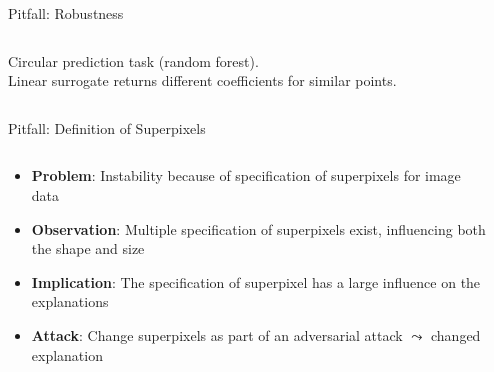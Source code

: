 \documentclass[11pt,compress,t,notes=noshow, aspectratio=169, xcolor=table]{beamer}
\begin{document}
\begin{frame}[c]{Pitfall: Robustness }
\begin{columns}
\begin{column}{0.48\textwidth}
\begin{center}
	{Circular prediction task (random forest). \\Linear surrogate returns different coefficients for similar points.}
	
	\end{center}
\end{column}
\end{columns}
\end{frame}

\begin{frame}{Pitfall: Definition of Superpixels }

\begin{columns}
    
    \begin{column}{0.6\textwidth}
        
        \begin{itemize}
        	\item \textbf{Problem}: Instability because of specification of superpixels for image data 
        	\item \textbf{Observation}: Multiple specification of superpixels exist, influencing both the shape and size 
        	\pause
        	\item \textbf{Implication}: The specification of superpixel has a large influence on the explanations 
        	\item \textbf{Attack}: Change superpixels as part of an adversarial attack $\leadsto$ changed explanation
        \end{itemize}
        
    \end{column}
    
    \begin{column}{0.4\textwidth}
    

\end{column}
\end{columns}
\end{frame}
\end{document}
